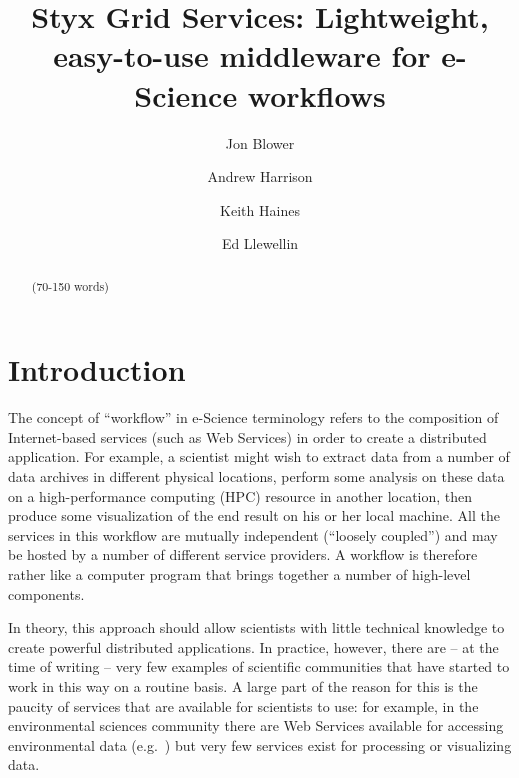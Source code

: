 \documentclass{llncs}
\begin{document}
%
\title{Styx Grid Services: Lightweight, easy-to-use middleware for e-Science workflows}
%
%
\author{Jon Blower \and Andrew Harrison
\and Keith Haines \and Ed Llewellin}
%
%
%

\maketitle              %

\begin{abstract}
(70-150 words)
\end{abstract}
%
\section{Introduction}
The concept of ``workflow'' in e-Science terminology refers to the composition of Internet-based services (such as Web Services) in order to create a distributed application.  For example, a scientist might wish to extract data from a number of data archives in different physical locations, perform some analysis on these data on a high-performance computing (HPC) resource in another location, then produce some visualization of the end result on his or her local machine.  All the services in this workflow are mutually independent (``loosely coupled'') and may be hosted by a number of different service providers.  A workflow is therefore rather like a computer program that brings together a number of high-level components.

In theory, this approach should allow scientists with little technical knowledge to create powerful distributed applications.  In practice, however, there are -- at the time of writing -- very few examples of scientific communities that have started to work in this way on a routine basis.  A large part of the reason for this is the paucity of services that are available for scientists to use: for example, in the environmental sciences community there are Web Services available for accessing environmental data (e.g.\ \cite{Woolf:2003}) but very few services exist for processing or visualizing data.
\end{document}
